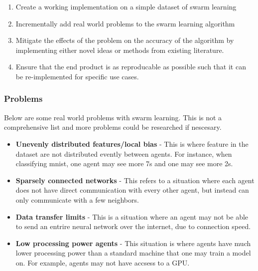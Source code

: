 \begin{enumerate}
	\item Create a working implementation on a simple dataset of swarm learning
	\item Incrementally add real world problems to the swarm learning algorithm
	\item Mitigate the effects of the problem on the accuracy of the algorithm by implementing either novel ideas or methods from existing literature.
	\item Ensure that the end product is as reproducable as possible such that it can be re-implemented for specific use cases.
\end{enumerate}
\subsubsection{Problems}
Below are some real world problems with swarm learning. This is not a comprehensive list and more problems could be researched if nescesary.
\begin{itemize}
	\item \textbf{Unevenly distributed features/local bias} - This is where feature in the dataset are not distributed evently between agents. For instance, when classifying mnist, one agent may see more 7s and one may see more 2s.
	\item \textbf{Sparsely connected networks} - This refers to a situation where each agent does not have direct communication with every other agent, but instead can only communicate with a few neighbors.
	\item \textbf{Data transfer limits} - This is a situation where an agent may not be able to send an entrire neural network over the internet, due to connection speed.
	\item \textbf{Low processing power agents} - This situation is where agents have much lower processing power than a standard machine that one may train a model on. For example, agents may not have accsess to a GPU.
\end{itemize}	

